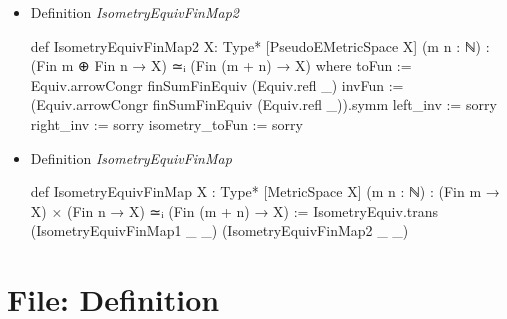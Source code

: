 \documentclass[colorinlistoftodos]{article}
\begin{document}
\begin{itemize}
\begin{leancode}
\end{leancode}
  \item Definition \emph{IsometryEquivFinMap2}
\begin{leancode}
def IsometryEquivFinMap2 {X: Type*} [PseudoEMetricSpace X] (m n : ℕ) : 
(Fin m ⊕ Fin n → X) ≃ᵢ (Fin (m + n) → X) where
  toFun := Equiv.arrowCongr finSumFinEquiv (Equiv.refl _)
  invFun := (Equiv.arrowCongr finSumFinEquiv (Equiv.refl _)).symm
  left_inv := sorry
  right_inv := sorry
  isometry_toFun := sorry
\end{leancode}
  \item Definition \emph{IsometryEquivFinMap}
\begin{leancode}
def IsometryEquivFinMap {X : Type*} [MetricSpace X] (m n : ℕ) : 
(Fin m → X) × (Fin n → X) ≃ᵢ (Fin (m + n) → X) := 
  IsometryEquiv.trans (IsometryEquivFinMap1 _ _) (IsometryEquivFinMap2 _ _)
\end{leancode}
\end{itemize}

\section{File: Definition}
\end{document}
